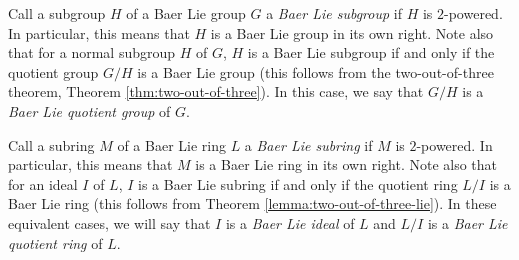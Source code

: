 Call a subgroup $H$ of a Baer Lie group $G$ a {\em Baer Lie subgroup}
if $H$ is $2$-powered. In particular, this means that $H$ is a Baer
Lie group in its own right. Note also that for a normal subgroup $H$
of $G$, $H$ is a Baer Lie subgroup if and only if the quotient group
$G/H$ is a Baer Lie group (this follows from the two-out-of-three
theorem, Theorem \ref{thm:two-out-of-three}). In this case, we say
that $G/H$ is a {\em Baer Lie quotient group} of $G$.

Call a subring $M$ of a Baer Lie ring $L$ a {\em Baer Lie subring} if
$M$ is $2$-powered. In particular, this means that $M$ is a Baer Lie
ring in its own right.  Note also that for an ideal $I$ of $L$, $I$ is
a Baer Lie subring if and only if the quotient ring $L/I$ is a Baer
Lie ring (this follows from Theorem
\ref{lemma:two-out-of-three-lie}). In these equivalent cases, we will
say that $I$ is a {\em Baer Lie ideal} of $L$ and $L/I$ is a {\em Baer
  Lie quotient ring} of $L$.

